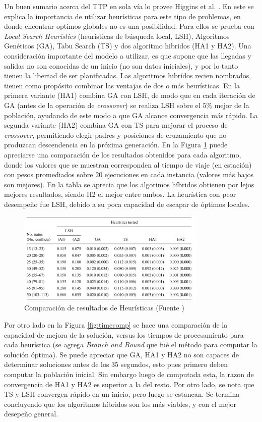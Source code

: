 \documentclass[letter, 10pt]{article}
\begin{document}
\begin{description}
	Un buen sumario acerca del TTP en sola vía lo provee Higgins et al. \cite{Higgins}. En este se explica la importancia de utilizar heurísticas para este tipo de problemas, en donde encontrar optimos globales no es una posibilidad. Para ellos se prueba con \textit{Local Search Heuristics} (heurísticas de búsqueda local, LSH), Algoritmos Genéticos (GA), Tabu Search (TS) y dos algoritmo hibridos (HA1 y HA2). Una consideración importante del modelo a utilizar, es que supone que las llegadas y salidas no son conocidas de un inicio (no son datos iniciales), y por lo tanto tienen la libertad de ser planificadas. Las algoritmos hibrídos recien nombrados, tienen como propósito combinar las ventajas de dos o más heurísticas. En la primera variante (HA1) combina GA con LSH, de modo que en cada iteración de GA (antes de la operación de \textit{crossover}) se realiza LSH sobre el $5\%$ mejor de la población, ayudando de este modo a que GA alcance convergencia más rápido. La segunda variante (HA2) combina GA con TS para mejorar el proceso de \textit{crossover}, permitiendo elegir padres y posiciones de cruzamiento que no produzcan descendencia en la próxima generación. En la Figura \ref{fig:rescomp} puede apreciarse una comparación de los resultados obtenidos para cada algoritmo, donde los valores que se muestran corresponden al tiempo de viaje (en estación) con pesos	promediados sobre $20$ ejecuciones en cada instancia (valores más bajos son mejores). En la tabla se aprecia que los algorimos híbridos obtienen por lejos mejores resultados, siendo H2 el mejor entre ambos. La heurística con peor desempeño fue LSH, debido a su poca capacidad de escapar de óptimos locales. 
 	\begin{figure}[htpb!]
	\centering
	\includegraphics[width=9cm]{rescomp}
	\caption{Comparación de resultados de Heurísticas (Fuente \cite{Higgins})}
	\label{fig:rescomp}
	\end{figure}
	Por otro lado en la Figura \ref{fig:timecomp} se hace una comparación de la capacidad de mejora de la solución, versus los tiempos de procesamiento para cada heurística (se agrega \textit{Branch and Bound} que fué el método para computar la solución óptima). Se puede apreciar que GA, HA1 y HA2 no son capaces de determinar soluciones antes de los $35$ segundos, esto pues primero deben computar la población inicial. Sin embargo luego de computada esta, la razon de convergencia de HA1 y HA2 es superior a la del resto. Por otro lado, se nota que TS y LSH convergen rápido en un inicio, pero luego se estancan. Se termina concluyendo que los algoritmos híbridos son los más viables, y con el mejor desepeño general.


\end{description}
\end{document}
